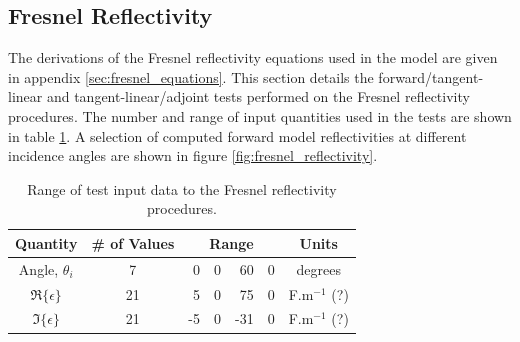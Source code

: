 \subsection{Fresnel Reflectivity}
The derivations of the Fresnel reflectivity equations used in the model are given in appendix \ref{sec:fresnel_equations}. This section details the forward/tangent-linear and tangent-linear/adjoint tests performed on the Fresnel reflectivity procedures. The number and range of input quantities used in the tests are shown in table \ref{tab:fresnel_input_range}. A selection of computed forward model reflectivities at different incidence angles are shown in figure \ref{fig:fresnel_reflectivity}.
\begin{table}[htp]
  \centering
  \begin{tabular}{| c | c | r@{.}l@{ - }r@{.}l | c |}
    \hline
    \textbf{Quantity} & \textbf{\# of Values} & \multicolumn{4}{c|}{\textbf{Range}} & \textbf{Units} \\
    \hline\hline
    Angle, $\theta_i$ &  7 &  0&0 &  60&0 & degrees \\
    $\Re\{\epsilon\}$ & 21 &  5&0 &  75&0 & F.m$^{-1}$ (?) \\
    $\Im\{\epsilon\}$ & 21 & -5&0 & -31&0 & F.m$^{-1}$ (?) \\
    \hline
  \end{tabular}
  \caption{Range of test input data to the Fresnel reflectivity procedures.}
  \label{tab:fresnel_input_range}
\end{table}

